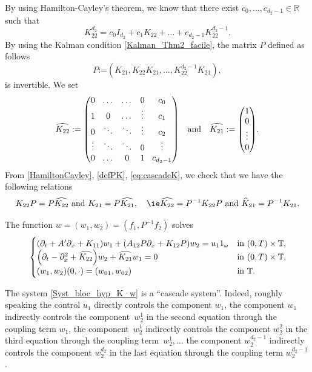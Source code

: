 \documentclass[JEP,XML,SOM,Unicode,NoEqCountersInSection]{cedram}
\theoremstyle{plain}
\theoremstyle{definition}
\theoremstyle{remark}
\newcommand{\set}{\mathbb}
\newcommand{\R}{} %
\renewcommand{\R}{\set{R}}
\newcommand{\T}{\set{T}}
\newcommand{\coloneqq}{\mathrel{\mathord{:}\mathord=}}
\let\originalleft\left
\let\originalright\right
\renewcommand{\left}{\mathopen{}\mathclose\bgroup\originalleft}
\renewcommand{\right}{\aftergroup\egroup\originalright}
\begin{document}
By using Hamilton-Cayley's theorem, we know that there exist $c_0, \dots, c_{d_2-1} \in \R$ such that
\begin{equation}
\label{HamiltonCayley}
K_{22}^{d_2} = c_0 I_{d_2} + c_1 K_{22} + \dots + c_{d_2-1} K_{22}^{d_2-1}.
\end{equation}
By using the Kalman condition \eqref{Kalman_Thm2_facile}, the matrix $P$ defined as follows
\begin{equation}
\label{defPK}
P \coloneqq (K_{21}, K_{22} K_{21}, \dots, K_{22}^{d_2-1} K_{21}),
\end{equation}
is invertible. We set
\begin{equation}
\label{eq:cascadeK}
\arraycolsep4.5pt
\widehat{K_{22}}\coloneqq \begin{pmatrix} 0 & \dots & \dots & 0 & c_0\\
1 & 0 &\dots & \vdots & c_1\\
0 & \ddots & \ddots & \vdots & c_2\\
\vdots & \ddots & \ddots & 0 & \vdots\\
0 & \dots &0 & 1 & c_{d_2-1}
\end{pmatrix}\quad \text{and}\quad \widehat{K_{21}}\coloneqq \begin{pmatrix} 1\\0\\ \vdots\\ 0 \end{pmatrix}.
\end{equation}
From \eqref{HamiltonCayley}, \eqref{defPK}, \eqref{eq:cascadeK}, we check that we have the following relations
\[
K_{22}P = P \widehat{K_{22}}\ \text{and}\ K_{21} = P \widehat{K_{21}},\quad \text{\ie} \widehat{K_{22}}= P^{-1} K_{22} P\ \text{and}\ {\widehat K}_{21}= P^{-1} K_{21}.
\]

The function $w =(w_1,w_2) = (f_1,P^{-1}f_2)$ solves
\begin{equation} \label{Syst_bloc_hyp_K_w}
\begin{cases}
\left(\partial_t +A'\partial_x+K_{11}\right)w_1+\left(A_{12}P\partial_x+K_{12}P\right)w_2= u_1 1_\omega
&\text{in}\ (0,T)\times \T,\!\\
\left(\partial_t - \partial_x^2+\widehat{K_{22}}\right)w_2 + \widehat{K_{21}}w_1 = 0 &\text{in}\ (0,T)\times \T,\!\\
(w_1,w_2)(0,\cdot)=(w_{01},w_{02}) & \text{in}\ \T.
\end{cases}
\end{equation}

The system \eqref{Syst_bloc_hyp_K_w} is a ``cascade system''. Indeed, roughly speaking the control $u_1$ directly controls the component $w_1$, the component $w_1$ indirectly controls the component~$w_{2}^1$ in the second equation through the coupling term $w_1$, the component~$w_{2}^1$ indirectly controls the component $w_{2}^2$ in the third equation through the coupling term~$w_2^1,\ldots$ the component $w_{2}^{d_2-1}$ indirectly controls the component $w_{2}^{d_2}$ in the last equation through the coupling term $w_2^{d_2-1}$.
\end{document}

